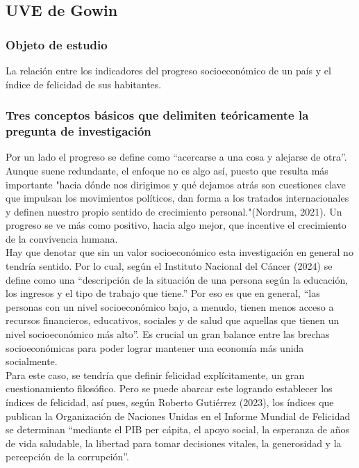 \documentclass[12pt,oneside,letterpaper,spanish]{article}
\begin{document}
\newpage

\subsection{UVE de Gowin}

\subsubsection{Objeto de estudio}
La relación entre los indicadores del progreso socioeconómico de un país y el índice de felicidad de sus habitantes.

\subsubsection{Tres conceptos básicos que delimiten teóricamente la pregunta de investigación}
Por un lado el progreso se define como ``acercarse a una cosa y alejarse de otra''. Aunque suene redundante, el enfoque no es algo así, puesto que resulta más importante "hacia dónde nos dirigimos y qué dejamos atrás son cuestiones clave que impulsan los movimientos políticos, dan forma a los tratados internacionales y definen nuestro propio sentido de crecimiento personal."(Nordrum, 2021). Un progreso se ve más como positivo, hacia algo mejor, que incentive el crecimiento de la convivencia humana. \\

Hay que denotar que sin un valor socioeconómico esta investigación en general no tendría sentido. Por lo cual, según 
el Instituto Nacional del Cáncer (2024) se define como una ``descripción de la situación de una persona según la educación, los ingresos y el tipo de trabajo que tiene.'' Por eso es que en general, ``las personas con un nivel socioeconómico bajo, a menudo, tienen menos acceso a recursos financieros, educativos, sociales y de salud que aquellas que tienen un nivel socioeconómico más alto''. Es crucial un gran balance entre las brechas socioeconómicas para poder lograr mantener una economía más unida socialmente. \\

Para este caso, se tendría que definir felicidad explícitamente, un gran cuestionamiento filosófico. Pero se puede abarcar este logrando establecer los índices de felicidad, así pues, según Roberto Gutiérrez (2023), los índices que publican la Organización de Naciones Unidas en el Informe Mundial de Felicidad se determinan ``mediante el PIB per cápita, el apoyo social, la esperanza de años de vida saludable, la libertad para tomar decisiones vitales, la generosidad y la percepción de la corrupción''.
\end{document}
